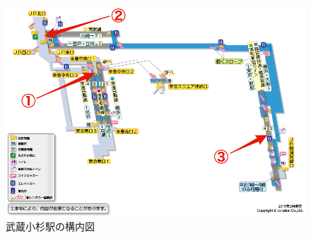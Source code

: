 \begin{figure}[h]
  \centering
  \includegraphics[width=120mm]{images/musako_2d.png}
  \caption{武蔵小杉駅の構内図} \label{fig:musako_2d}
\end{figure}
